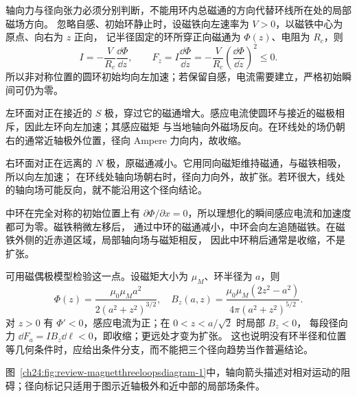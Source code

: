 \begin{xesolution}
轴向力与径向张力必须分别判断，不能用环内总磁通的方向代替环线所在处的局部磁场方向。
忽略自感、初始环静止时，设磁铁向左速率为 $V>0$，以磁铁中心为原点、向右为 $z$ 正向，
记半径固定的环所穿正向磁通为 $\Phi(z)$、电阻为 $R_c$，则
\[
 I=-\frac{V}{R_c}\frac{\dd\Phi}{\dd z},\qquad
 F_z=I\frac{\dd\Phi}{\dd z}=-\frac V{R_c}\left(\frac{\dd\Phi}{\dd z}\right)^2\le0.
\]
所以非对称位置的圆环初始均向左加速；若保留自感，电流需要建立，严格初始瞬间可仍为零。

左环面对正在接近的 $S$ 极，穿过它的磁通增大。感应电流使圆环与接近的磁极相斥，因此左环向左加速；其感应磁矩
与当地轴向外磁场反向。在环线处的场仍朝右的通常近轴极外位置，径向 Ampere 力向内，故收缩。

右环面对正在远离的 $N$ 极，原磁通减小。它用同向磁矩维持磁通，与磁铁相吸，所以向左加速；
在环线处轴向场朝右时，径向力向外，故扩张。若环很大，线处的轴向场可能反向，就不能沿用这个径向结论。

中环在完全对称的初始位置上有 $\partial\Phi/\partial x=0$，所以理想化的瞬间感应电流和加速度都可为零。磁铁稍微左移后，
通过中环的磁通减小，中环会向左追随磁铁。在磁铁外侧的近赤道区域，局部轴向场与磁矩相反，
因此中环稍后通常是收缩，不是扩张。

可用磁偶极模型检验这一点。设磁矩大小为 $\mu_M$、环半径为 $a$，则
\[
 \Phi(z)=\frac{\mu_0\mu_Ma^2}{2(a^2+z^2)^{3/2}},\quad
 B_z(a,z)=\frac{\mu_0\mu_M(2z^2-a^2)}{4\pi(a^2+z^2)^{5/2}}.
\]
对 $z>0$ 有 $\Phi'<0$，感应电流为正；在 $0<z<a/\sqrt2$ 时局部 $B_z<0$，
每段径向力 $\dd F_a=I B_z\dd\ell<0$，即收缩；更远处才变为扩张。
这也说明没有环半径和位置等几何条件时，应给出条件分支，而不能把三个径向趋势当作普遍结论。

图~\ref{ch24:fig:review-magnetthreeloopsdiagram-1}中，轴向箭头描述对相对运动的阻碍；径向标记只适用于图示近轴极外和近中部的局部场条件。
\par\noindent\begin{minipage}{\linewidth}
\magnetThreeLoopsDiagram
{}\label{ch24:fig:review-magnetthreeloopsdiagram-1}
\end{minipage}\par\medskip
\end{xesolution}

